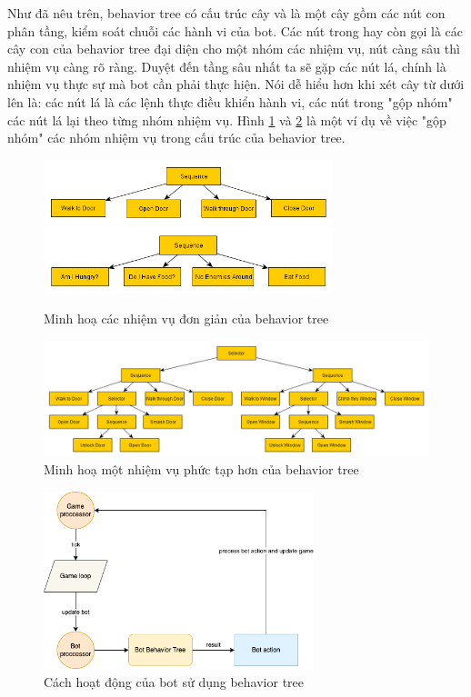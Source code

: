 \documentclass[12pt,a4paper]{article}
\begin{document}
  Như đã nêu trên, behavior tree có cấu trúc cây và là một cây gồm các nút con phân tầng, kiểm soát chuỗi các hành vi của bot. Các nút trong hay còn gọi là các cây con của behavior tree đại diện cho một nhóm các nhiệm vụ, nút càng sâu thì nhiệm vụ càng rõ ràng. Duyệt đến tầng sâu nhất ta sẽ gặp các nút lá, chính là nhiệm vụ thực sự mà bot cần phải thực hiện. Nói dễ hiểu hơn khi xét cây từ dưới lên là: các nút lá là các lệnh thực điều khiển hành vi, các nút trong "gộp nhóm" các nút lá lại theo từng nhóm nhiệm vụ. Hình \ref{fig:simple_bt_node_example} và \ref{fig:combind_bt_node_example} là một ví dụ về việc "gộp nhóm" các nhóm nhiệm vụ trong cấu trúc của behavior tree.
  \begin{figure}[H]
      \centering
      \includegraphics[width=0.75\textwidth]{Img/AI/simple-node-of-behavior-tree-1.png}
      \includegraphics[width=0.75\textwidth]{Img/AI/simple-node-of-behavior-tree-2.png}
      \caption{Minh hoạ các nhiệm vụ đơn giản của behavior tree\cite{bib17}}
      \label{fig:simple_bt_node_example}
  \end{figure}
  \begin{figure}[H]
      \centering
      \includegraphics[width=1\textwidth]{Img/AI/complex-node-of-behavior-tree.png}
      \caption{Minh hoạ một nhiệm vụ phức tạp hơn của behavior tree\cite{bib17}}
      \label{fig:combind_bt_node_example}
  \end{figure}

  \begin{figure}[H]
      \centering
      \includegraphics[width=0.7\textwidth]{Img/AI/bot_tick.png}
      \caption{Cách hoạt động của bot sử dụng behavior tree}
  \end{figure}
\end{document}
